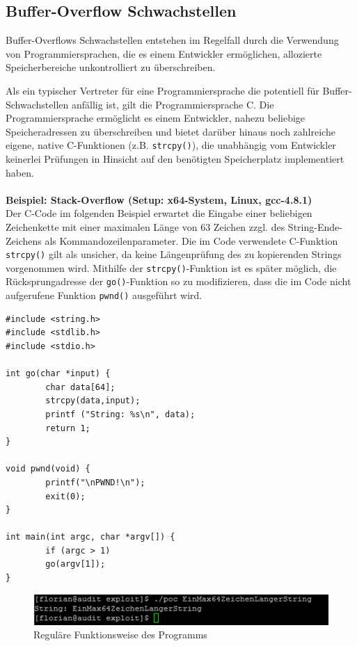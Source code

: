 \subsection{Buffer-Overflow Schwachstellen}	

Buffer-Overflows Schwachstellen entstehen im Regelfall durch die Verwendung von Programmiersprachen, die es einem Entwickler ermöglichen, allozierte Speicherbereiche unkontrolliert zu überschreiben.
\par\medskip 
Als ein typischer Vertreter für eine Programmiersprache die potentiell für Buffer-Schwachstellen anfällig ist, gilt die Programmiersprache C. Die Programmiersprache ermöglicht es einem Entwickler, nahezu beliebige Speicheradressen zu überschreiben und bietet darüber hinaus noch zahlreiche eigene, native C-Funktionen (z.B. \texttt{strcpy()}), die unabhängig vom Entwickler keinerlei Prüfungen in Hinsicht auf den benötigten Speicherplatz implementiert haben.
\\\\
\textbf{Beispiel: Stack-Overflow (Setup: x64-System, Linux, gcc-4.8.1)}
\\
Der C-Code im folgenden Beispiel erwartet die Eingabe einer beliebigen Zeichenkette mit einer maximalen Länge von 63 Zeichen zzgl. des String-Ende-Zeichens als Kommandozeilenparameter. Die im Code verwendete C-Funktion \texttt{strcpy()} gilt als unsicher, da keine Längenprüfung des zu kopierenden Strings vorgenommen wird. Mithilfe der \texttt{strcpy()}-Funktion ist es später möglich, die Rücksprungadresse der \texttt{go()}-Funktion so zu modifizieren, dass die im Code nicht aufgerufene Funktion \texttt{pwnd()} ausgeführt wird.

\begin{lstlisting}[basicstyle=\ttfamily\footnotesize]
#include <string.h>
#include <stdlib.h>
#include <stdio.h>

int go(char *input) {
        char data[64];
        strcpy(data,input);
        printf ("String: %s\n", data);
        return 1;
}

void pwnd(void) {
        printf("\nPWND!\n");
        exit(0);
}

int main(int argc, char *argv[]) {
        if (argc > 1)
        go(argv[1]);
}
\end{lstlisting}

\begin{figure}[htbp]
 \centering
 \includegraphics[scale=.5]{abbildungen/poc_1}
 \caption{Reguläre Funktionsweise des Programms}
 \label{fig:poc_1} 
\end{figure}

